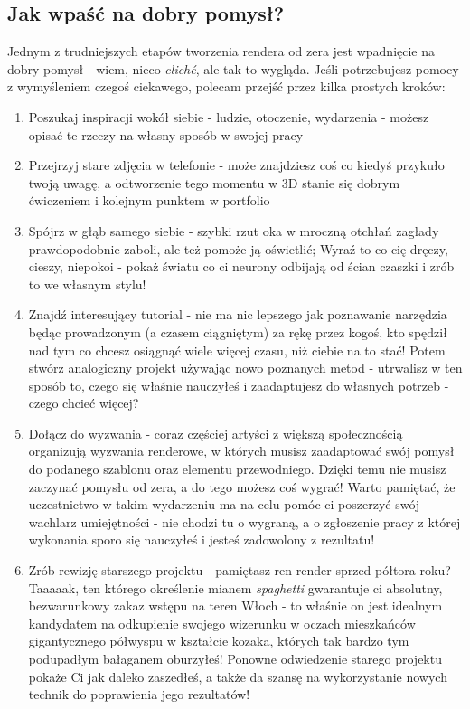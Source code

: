 \subsection{Jak wpaść na dobry pomysł?}
Jednym z trudniejszych etapów tworzenia rendera od zera jest wpadnięcie na dobry pomysł - wiem, nieco \textit{cliché}, ale tak to wygląda. Jeśli potrzebujesz pomocy z wymyśleniem czegoś ciekawego, polecam przejść przez kilka prostych kroków:
\begin{enumerate}
    \item Poszukaj inspiracji wokół siebie - ludzie, otoczenie, wydarzenia - możesz opisać te rzeczy na własny sposób w swojej pracy
    \item Przejrzyj stare zdjęcia w telefonie - może znajdziesz coś co kiedyś przykuło twoją uwagę, a odtworzenie tego momentu w 3D stanie się dobrym ćwiczeniem i kolejnym punktem w portfolio
    \item Spójrz w głąb samego siebie - szybki rzut oka w mroczną otchłań zagłady prawdopodobnie zaboli, ale też pomoże ją oświetlić; Wyraź to co cię dręczy, cieszy, niepokoi - pokaż światu co ci neurony odbijają od ścian czaszki i zrób to we własnym stylu!
    \item Znajdź interesujący tutorial - nie ma nic lepszego jak poznawanie narzędzia będąc prowadzonym (a czasem ciągniętym) za rękę przez kogoś, kto spędził nad tym co chcesz osiągnąć wiele więcej czasu, niż ciebie na to stać! Potem stwórz analogiczny projekt używając nowo poznanych metod - utrwalisz w ten sposób to, czego się właśnie nauczyłeś i zaadaptujesz do własnych potrzeb - czego chcieć więcej?
    \item Dołącz do wyzwania - coraz częściej artyści z większą społecznością organizują wyzwania renderowe, w których musisz zaadaptować swój pomysł do podanego szablonu oraz elementu przewodniego. Dzięki temu nie musisz zaczynać pomysłu od zera, a do tego możesz coś wygrać! Warto pamiętać, że uczestnictwo w takim wydarzeniu ma na celu pomóc ci poszerzyć swój wachlarz umiejętności - nie chodzi tu o wygraną, a o zgłoszenie pracy z której wykonania sporo się nauczyłeś i jesteś zadowolony z rezultatu!
    \item Zrób rewizję starszego projektu - pamiętasz ren render sprzed półtora roku? Taaaaak, ten którego określenie mianem \textit{spaghetti} gwarantuje ci absolutny, bezwarunkowy zakaz wstępu na teren Włoch - to właśnie on jest idealnym kandydatem na odkupienie swojego wizerunku w oczach mieszkańców gigantycznego półwyspu w kształcie kozaka, których tak bardzo tym podupadłym bałaganem oburzyłeś! Ponowne odwiedzenie starego projektu pokaże Ci jak daleko zaszedłeś, a także da szansę na wykorzystanie nowych technik do poprawienia jego rezultatów!
\end{enumerate}
